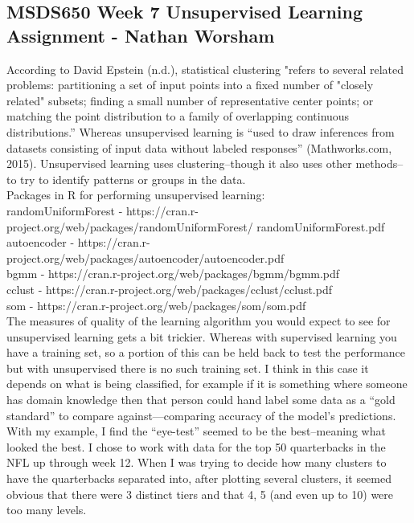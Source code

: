\documentclass[10pt]{article}
\begin{document}
\subsection*{MSDS650 Week 7 Unsupervised Learning Assignment - Nathan Worsham}
According to David Epstein (n.d.), statistical clustering "refers to several related problems: partitioning a set of input points into a fixed number of "closely related" subsets; finding a small number of representative center points; or matching the point distribution to a family of overlapping continuous distributions.” Whereas unsupervised learning is “used to draw inferences from datasets consisting of input data without labeled responses” (Mathworks.com, 2015). Unsupervised learning uses clustering--though it also uses other methods--to try to identify patterns or groups in the data.\\
Packages in R for performing unsupervised learning:\\
randomUniformForest - https://cran.r-project.org/web/packages/randomUniformForest/
randomUniformForest.pdf\\
autoencoder - https://cran.r-project.org/web/packages/autoencoder/autoencoder.pdf\\
bgmm - https://cran.r-project.org/web/packages/bgmm/bgmm.pdf\\
cclust - https://cran.r-project.org/web/packages/cclust/cclust.pdf\\
som - https://cran.r-project.org/web/packages/som/som.pdf\\
The measures of quality of the learning algorithm you would expect to see for unsupervised learning gets a bit trickier. Whereas with supervised learning you have a training set, so a portion of this can be held back to test the performance but with unsupervised there is no such training set. I think in this case it depends on what is being classified, for example if it is something where someone has domain knowledge then that person could hand label some data as a “gold standard” to compare against—comparing accuracy of the model's predictions. With my example, I find the “eye-test” seemed to be the best--meaning what looked the best. I chose to work with data for the top 50 quarterbacks in the NFL up through week 12. When I was trying to decide how many clusters to have the quarterbacks separated into, after plotting several clusters, it seemed obvious that there were 3 distinct tiers and that 4, 5 (and even up to 10) were too many levels.\\
\end{document}
